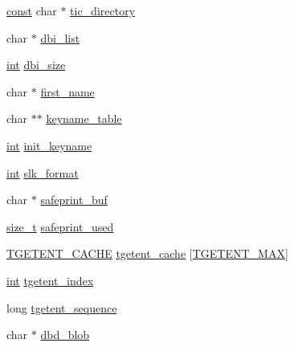 \begin{DoxyCompactItemize}
\item 
\hyperlink{term__entry_8h_a57bd63ce7f9a353488880e3de6692d5a}{const} char $\ast$ \hyperlink{struct_n_c_u_r_s_e_s___g_l_o_b_a_l_s_a981272a31a2c7d27df78cfa5bad2b56c}{tic\-\_\-directory}
\item 
char $\ast$ \hyperlink{struct_n_c_u_r_s_e_s___g_l_o_b_a_l_s_a679284da6b2883d10818d01e4f73b646}{dbi\-\_\-list}
\item 
\hyperlink{term__entry_8h_ad65b480f8c8270356b45a9890f6499ae}{int} \hyperlink{struct_n_c_u_r_s_e_s___g_l_o_b_a_l_s_a6a1a50cfa65486187bc0e7d9f5ad450c}{dbi\-\_\-size}
\item 
char $\ast$ \hyperlink{struct_n_c_u_r_s_e_s___g_l_o_b_a_l_s_a7c70dd4ac9f0b4e4a687b9a75a6ce269}{first\-\_\-name}
\item 
char $\ast$$\ast$ \hyperlink{struct_n_c_u_r_s_e_s___g_l_o_b_a_l_s_abe29d666f1b163b4c283f53db9347a9b}{keyname\-\_\-table}
\item 
\hyperlink{term__entry_8h_ad65b480f8c8270356b45a9890f6499ae}{int} \hyperlink{struct_n_c_u_r_s_e_s___g_l_o_b_a_l_s_af39585cad5667767151e21016c8c387a}{init\-\_\-keyname}
\item 
\hyperlink{term__entry_8h_ad65b480f8c8270356b45a9890f6499ae}{int} \hyperlink{struct_n_c_u_r_s_e_s___g_l_o_b_a_l_s_a635cbbbe41e1a338bfdf49d918cd73bd}{slk\-\_\-format}
\item 
char $\ast$ \hyperlink{struct_n_c_u_r_s_e_s___g_l_o_b_a_l_s_aff76a81387b2d58c2e8a9514765d6bda}{safeprint\-\_\-buf}
\item 
\hyperlink{nc__alloc_8h_a7b60c5629e55e8ec87a4547dd4abced4}{size\-\_\-t} \hyperlink{struct_n_c_u_r_s_e_s___g_l_o_b_a_l_s_a47c7aa2dc06224cf9207e7bc81041ab1}{safeprint\-\_\-used}
\item 
\hyperlink{struct_t_g_e_t_e_n_t___c_a_c_h_e}{T\-G\-E\-T\-E\-N\-T\-\_\-\-C\-A\-C\-H\-E} \hyperlink{struct_n_c_u_r_s_e_s___g_l_o_b_a_l_s_a15cba14256131fbab6c0f69fb14e0e2f}{tgetent\-\_\-cache} \mbox{[}\hyperlink{curses_8priv_8h_af2503688473255f738b341e1a296f04c}{T\-G\-E\-T\-E\-N\-T\-\_\-\-M\-A\-X}\mbox{]}
\item 
\hyperlink{term__entry_8h_ad65b480f8c8270356b45a9890f6499ae}{int} \hyperlink{struct_n_c_u_r_s_e_s___g_l_o_b_a_l_s_afc8d6693be6b54755725f06da01d9e97}{tgetent\-\_\-index}
\item 
long \hyperlink{struct_n_c_u_r_s_e_s___g_l_o_b_a_l_s_a9e6bb73eea9da604dfdc4871a74cf827}{tgetent\-\_\-sequence}
\item 
char $\ast$ \hyperlink{struct_n_c_u_r_s_e_s___g_l_o_b_a_l_s_af61fdbdce5329e30f2bab864c6c5a134}{dbd\-\_\-blob}
$$
\end{DoxyCompactItemize}
